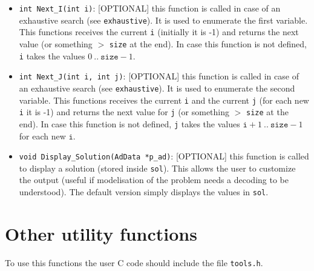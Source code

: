 \documentclass{article}
\begin{document}
\begin{itemize}
\item \texttt{int Next\_I(int i)}: [OPTIONAL] this function is called in case
 of an exhaustive search (see \texttt{exhaustive}). It is used to
 enumerate the first variable. This functions receives the current \texttt{i}
 (initially it is -1) and returns the next value (or something $>$
 \texttt{size} at the end). In case this function is not defined,
 \texttt{i} takes the values $0~..~\texttt{size} - 1$.

\item \texttt{int Next\_J(int i, int j)}: [OPTIONAL] this function is called
 in case of an exhaustive search (see \texttt{exhaustive}). It is used to
 enumerate the second variable. This functions receives the current
 \texttt{i} and the current \texttt{j} (for each new \texttt{i} it is -1) and
 returns the next value for \texttt{j} (or something $>$ \texttt{size} at
 the end). In case this function is not defined, \texttt{j} takes the values
 $\texttt{i}+1~..~\texttt{size}-1$ for each new $\texttt{i}$.

\item \texttt{void Display\_Solution(AdData *p\_ad)}: [OPTIONAL] this
  function is called to display a solution (stored inside \texttt{sol}). This
  allows the user to customize the output (useful if modelisation of the
  problem needs a decoding to be understood). The default version simply
  displays the values in \texttt{sol}.

\end{itemize}

\section{Other utility functions}

To use this functions the user C code should include the file
\texttt{tools.h}.
\end{document}
